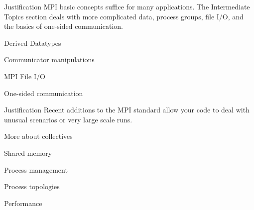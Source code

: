 \documentclass[11pt,headernav]{beamer}
\begin{document}
\begin{frame}{Justification}
  MPI basic concepts suffice for many applications.  The Intermediate
  Topics section deals with more complicated data, process groups,
  file I/O, and the basics of one-sided communication.
\end{frame}

 {Derived Datatypes}


 {Communicator manipulations}


 {MPI File I/O}


 {One-sided communication}
 



\begin{frame}{Justification}
  Recent additions to the MPI standard allow your 
  code to deal with unusual scenarios or very large scale runs.
\end{frame}

 {More about collectives}


 {Shared memory}


 {Process management}


 {Process topologies}


 {Performance}

\end{document}
